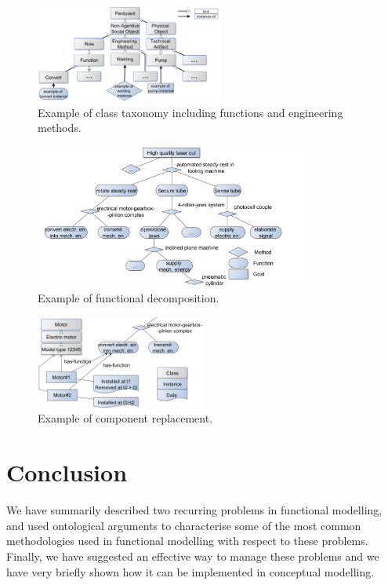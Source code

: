 \documentclass[
]{ceurart}
\begin{document}
\begin{figure}
  \centering
  \includegraphics[width=0.55\textwidth]{class-taxonomy-small.png}
  \caption{\label{fig:class-taxonomy} Example of class taxonomy including functions and engineering methods.}
\end{figure}
\begin{figure}
  \centering
  \includegraphics[width=0.80\textwidth]{functional-decomposition-small.png}
  \caption{\label{fig:functional-decomposition} Example of functional decomposition.}
\end{figure}
\begin{figure}
  \centering
  \includegraphics[width=0.50\textwidth]{functional-decomposition-with-replacement-small.png}
  \caption{\label{fig:replacement} Example of component replacement.}
\end{figure}

\section{Conclusion}
We have summarily described two recurring problems in functional modelling, and used ontological arguments to characterise some of the most common methodologies used in functional modelling with respect to these problems.
Finally, we have suggested an effective way to manage these problems and we have very briefly shown how it can be implemented in conceptual modelling.
\end{document}
